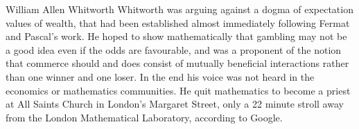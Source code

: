 \begin{history}{William Allen Whitworth}
Whitworth was arguing against a dogma of expectation values of wealth, that had 
been established almost immediately following Fermat and Pascal's work. He 
hoped to show mathematically that gambling may not be a good idea even if 
the odds are favourable, and was a 
proponent of the notion that commerce should and does
consist of mutually beneficial interactions rather than one winner and one loser. 
In the end his voice was not heard in the economics
or mathematics communities. He quit mathematics to become a priest at All Saints Church
in London's Margaret Street, only a 22 minute stroll away from the London 
Mathematical Laboratory, according to Google.
%
%
\end{history}
